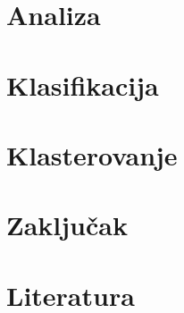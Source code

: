 \documentclass[a4paper,12pt]{article}
\begin{document}
\section{Analiza}
\newpage
\section{Klasifikacija}
\newpage
\section{Klasterovanje}
\newpage
\section{Zaključak}
\newpage
\section{Literatura}
\end{document}

